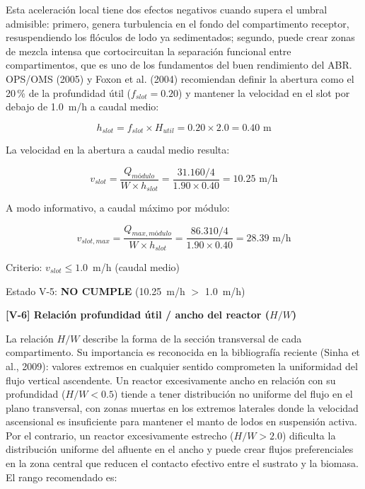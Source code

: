 \documentclass[12pt,a4paper]{article}
\begin{document}
Esta aceleración local tiene dos efectos negativos cuando supera el umbral admisible: primero, genera turbulencia en el fondo del compartimento receptor, resuspendiendo los flóculos de lodo ya sedimentados; segundo, puede crear zonas de mezcla intensa que cortocircuitan la separación funcional entre compartimentos, que es uno de los fundamentos del buen rendimiento del ABR. OPS/OMS (2005) y Foxon et al. (2004) recomiendan definir la abertura como el 20\,\% de la profundidad útil ($f_{slot} = 0.20$) y mantener la velocidad en el slot por debajo de 1.0~m/h a caudal medio:

\begin{equation}
h_{slot} = f_{slot} \times H_{util} = 0.20 \times 2.0 = 0.40 \text{ m}
\end{equation}

La velocidad en la abertura a caudal medio resulta:

\begin{equation}
v_{slot} = \frac{Q_{módulo}}{W \times h_{slot}} = \frac{31.160 / 4}{1.90 \times 0.40} = 10.25 \text{ m/h}
\end{equation}

A modo informativo, a caudal máximo por módulo:

\begin{equation}
v_{slot,max} = \frac{Q_{max,módulo}}{W \times h_{slot}} = \frac{86.310 / 4}{1.90 \times 0.40} = 28.39 \text{ m/h}
\end{equation}

Criterio: $v_{slot} \leq 1.0$~m/h (caudal medio)

Estado V-5: \textbf{NO CUMPLE} (10.25~m/h $>$ 1.0~m/h)

\textbf{[V-6] Relación profundidad útil / ancho del reactor ($H/W$)}

La relación $H/W$ describe la forma de la sección transversal de cada compartimento. Su importancia es reconocida en la bibliografía reciente (Sinha et al., 2009): valores extremos en cualquier sentido comprometen la uniformidad del flujo vertical ascendente. Un reactor excesivamente ancho en relación con su profundidad ($H/W < 0.5$) tiende a tener distribución no uniforme del flujo en el plano transversal, con zonas muertas en los extremos laterales donde la velocidad ascensional es insuficiente para mantener el manto de lodos en suspensión activa. Por el contrario, un reactor excesivamente estrecho ($H/W > 2.0$) dificulta la distribución uniforme del afluente en el ancho y puede crear flujos preferenciales en la zona central que reducen el contacto efectivo entre el sustrato y la biomasa. El rango recomendado es:
\end{document}
